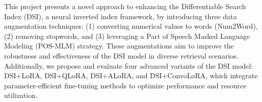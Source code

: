 

This project presents a novel approach to enhancing the Differentiable Search Index (DSI), a neural inverted index framework, by introducing three data augmentation techniques: (1) converting numerical values to words (Num2Word), (2) removing stopwords, and (3) leveraging a Part of Speech Masked Language Modeling (POS-MLM) strategy. These augmentations aim to improve the robustness and effectiveness of the DSI model in diverse retrieval scenarios. Additionally, we propose and evaluate four advanced variants of the DSI model: DSI+LoRA, DSI+QLoRA, DSI+ALoRA, and DSI+ConvoLoRA, which integrate parameter-efficient fine-tuning methods to optimize performance and resource utilization.

